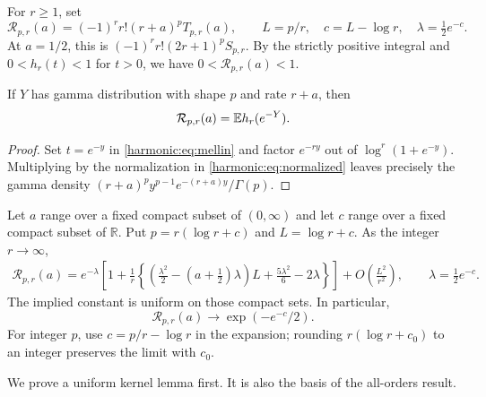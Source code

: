 For $r\ge1$, set
\begin{equation}\label{harmonic:eq:normalized}
 \mathcal R_{p,r}(a)=(-1)^r r!(r+a)^pT_{p,r}(a),
 \qquad L=p/r,\quad c=L-\log r,\quad\lambda=\tfrac12e^{-c}.
\end{equation}
At $a=1/2$, this is $(-1)^r r!(2r+1)^pS_{p,r}$. By the strictly positive integral and $0<h_r(t)<1$ for $t>0$, we have $0<\mathcal R_{p,r}(a)<1$.

\begin{proposition}\label{harmonic:prop:gammaLaw}
If $Y$ has gamma distribution with shape $p$ and rate $r+a$, then
\begin{equation}\label{harmonic:eq:gammaLaw}
 \mathcal R_{p,r}(a)=\mathbb E h_r(e^{-Y}).
\end{equation}
\end{proposition}
\begin{proof}
Set $t=e^{-y}$ in \eqref{harmonic:eq:mellin} and factor $e^{-ry}$ out of $\log^r(1+e^{-y})$. Multiplying by the normalization in \eqref{harmonic:eq:normalized} leaves precisely the gamma density
$(r+a)^p y^{p-1}e^{-(r+a)y}/\Gamma(p)$.
\end{proof}

\begin{theorem}\label{harmonic:thm:transition}
Let $a$ range over a fixed compact subset of $(0,\infty)$ and let $c$ range over a fixed compact subset of $\mathbb R$. Put $p=r(\log r+c)$ and $L=\log r+c$. As the integer $r\to\infty$,
\begin{align}\label{harmonic:eq:transition}
 \mathcal R_{p,r}(a)
 =e^{-\lambda}\left[1+\frac1r
 \left\{\left(\frac{\lambda^2}{2}-(a+\tfrac12)\lambda\right)L
                  +\frac{5\lambda^2}{6}-2\lambda\right\}\right]
 +O\!\left(\frac{L^2}{r^2}\right),
 \qquad \lambda=\tfrac12e^{-c}.
\end{align}
The implied constant is uniform on those compact sets. In particular,
\begin{equation}\label{harmonic:eq:profile}
 \mathcal R_{p,r}(a)\longrightarrow\exp(-e^{-c}/2).
\end{equation}
For integer $p$, use $c=p/r-\log r$ in the expansion; rounding $r(\log r+c_0)$ to an integer preserves the limit with $c_0$.
\end{theorem}

We prove a uniform kernel lemma first. It is also the basis of the all-orders result.


